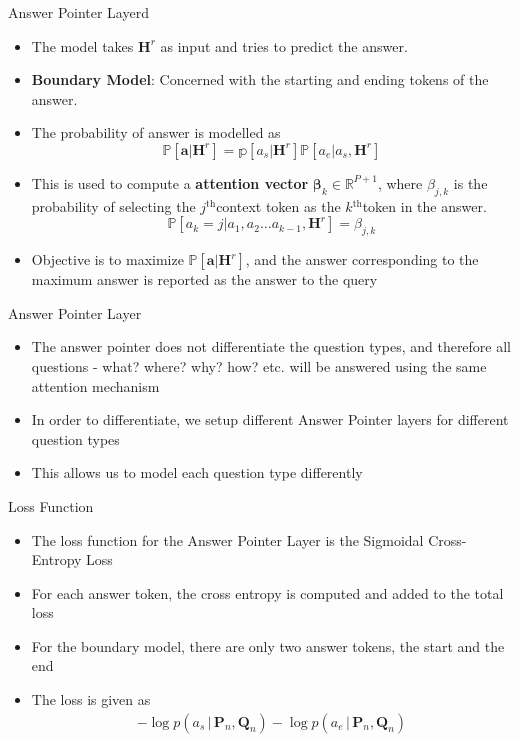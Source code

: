\documentclass[10pt]{beamer}
\def\*#1{\mathbf{#1}}
\newcommand{\tth}{$^{\text{th}}$}
\begin{document}
\begin{frame}{Answer Pointer Layerd}
	\begin{itemize}[<+- | alert@+>]
		\item The model takes $\*H^r$ as input and tries to predict the answer.
		\item \textbf{Boundary Model}: Concerned with the starting and ending tokens of the answer.
		\item The probability of answer is modelled as $$\mathbb{P}[\*a|\*H^r] = \mathbb{p}[a_s|\*H^r]\mathbb{P}[a_e|a_s,\*H^r]$$
		\item This is used to compute a \textbf{attention vector} $\*\beta_k \in \mathbb{R}^{P+1}$, where $\beta_{j, k}$ is the probability of selecting the $j$\tth context token as the $k$\tth token in the answer.
			$$\mathbb{P}[a_k = j| a_1, a_2 \dots a_{k - 1}, \*H^r] =	\beta_{j, k}$$
		\item Objective is to maximize $\mathbb{P}[\*a|\*H^r]$, and the answer corresponding to the maximum answer is reported as the answer to the query
	\end{itemize}

\end{frame}

\begin{frame}{Answer Pointer Layer}
	\begin{itemize}[<+- | alert@+>]
		\item The answer pointer does not differentiate the question types, and therefore all questions - what? where? why? how? etc. will be answered using the same attention mechanism
		\item In order to differentiate, we setup different Answer Pointer layers for different question types
		\item This allows us to model each question type differently
	\end{itemize}
\end{frame}

\begin{frame}{Loss Function}

	\begin{itemize}[<+- | alert@+>]
		\item The loss function for the Answer Pointer Layer is the Sigmoidal Cross-Entropy Loss
		\item For each answer token, the cross entropy is computed and added to the total loss
		\item For the boundary model, there are only two answer tokens, the start and the end
		\item The loss is given as
			\begin{align*}
				- \log{p(a_s \,|\, \boldsymbol{P}_n, \boldsymbol{Q}_n)} - \log{p(a_e \,|\, \boldsymbol{P}_n, \boldsymbol{Q}_n)}
			\end{align*}
	\end{itemize}

\end{frame}
\end{document}
